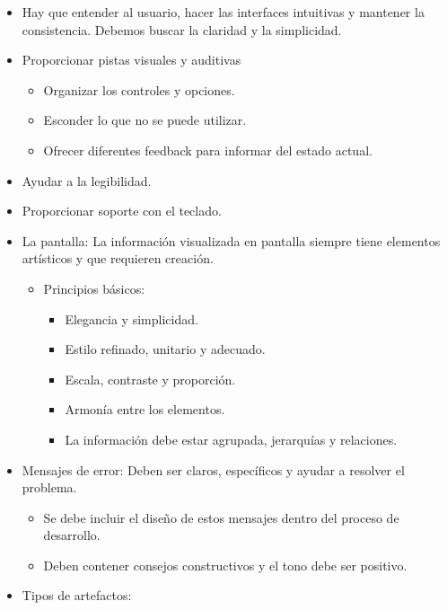 \documentclass[12pt, twoside, openright]{report} %
\begin{document}
  \begin{itemize}
  
  \item
    Hay que entender al usuario, hacer las interfaces intuitivas y
    mantener la consistencia. Debemos buscar la claridad y la
    simplicidad.
  \item
    Proporcionar pistas visuales y auditivas

    \begin{itemize}
    
    \item
      Organizar los controles y opciones.
    \item
      Esconder lo que no se puede utilizar.
    \item
      Ofrecer diferentes feedback para informar del estado actual.
    \end{itemize}
  \item
    Ayudar a la legibilidad.
  \item
    Proporcionar soporte con el teclado.
	\pagebreak
  \item
    La pantalla: La información visualizada en pantalla siempre tiene
    elementos artísticos y que requieren creación.

    \begin{itemize}
    
    \item
      Principios básicos:

      \begin{itemize}
      
      \item
        Elegancia y simplicidad.
      \item
        Estilo refinado, unitario y adecuado.
      \item
        Escala, contraste y proporción.
      \item
        Armonía entre los elementos.
      \item
        La información debe estar agrupada, jerarquías y relaciones.
      \end{itemize}
    \end{itemize}
  \item
    Mensajes de error: Deben ser claros, específicos y ayudar a resolver
    el problema.

    \begin{itemize}
    
    \item
      Se debe incluir el diseño de estos mensajes dentro del proceso de
      desarrollo.
    \item
      Deben contener consejos constructivos y el tono debe ser positivo.
    \end{itemize}
  \item
    Tipos de artefactos:


\end{itemize}
\end{document}
